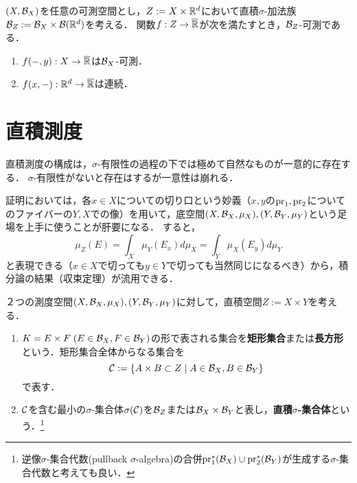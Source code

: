 \documentclass[uplatex, dvipdfmx]{jsreport}
\begin{document}
\begin{theorem}[直積の普遍性の破れ]
    $(X,\mathcal{B}_X)$を任意の可測空間とし，$Z:=X\times\mathbb{R}^d$において直積$\sigma$-加法族$\mathcal{B}_Z:=\mathcal{B}_X\times\mathcal{B}(\mathbb{R}^d)$を考える．
    関数$f:Z\to\overline{\mathbb{R}}$が次を満たすとき，$\mathcal{B}_Z$-可測である．
    \begin{enumerate}
        \item $f(-,y):X\to\overline{\mathbb{R}}$は$\mathcal{B}_X$-可測．
        \item $f(x,-):\mathbb{R}^d\to\overline{\mathbb{R}}$は連続．
    \end{enumerate}
\end{theorem}

\section{直積測度}

\begin{tcolorbox}[colframe=ForestGreen, colback=ForestGreen!10!white,breakable,colbacktitle=ForestGreen!40!white,coltitle=black,fonttitle=\bfseries\sffamily,
title=直積測度を積分形で捉える]
    直積測度の構成は，$\sigma$-有限性の過程の下では極めて自然なものが一意的に存在する．
    $\sigma$-有限性がないと存在はするが一意性は崩れる．

    証明においては，各$x\in X$についての切り口という妙義（$x,y$の$\mathrm{pr}_1,\mathrm{pr}_2$についてのファイバーの$Y,X$での像）を用いて，底空間$(X,\mathcal{B}_X,\mu_X),(Y,\mathcal{B}_Y,\mu_Y)$という足場を上手に使うことが肝要になる．
    すると，
    \[\mu_Z(E)=\int_X\mu_Y(E_x)d\mu_X=\int_Y\mu_X(E_y)d\mu_Y\]
    と表現できる（$x\in X$で切っても$y\in Y$で切っても当然同じになるべき）から，積分論の結果（収束定理）が流用できる．
\end{tcolorbox}

\begin{definition}
    ２つの測度空間$(X,\mathcal{B}_X,\mu_X),(Y,\mathcal{B}_Y,\mu_Y)$に対して，直積空間$Z:=X\times Y$を考える．
    \begin{enumerate}
        \item $K=E\times F\;(E\in\mathcal{B}_X,F\in\mathcal{B}_Y)$の形で表される集合を\textbf{矩形集合}または\textbf{長方形}という．矩形集合全体からなる集合を\[\mathcal{C}:=\left\{A\times B\subset Z\mid A\in\mathcal{B}_X,B\in\mathcal{B}_Y\right\}\]で表す．
        \item $\mathcal{C}$を含む最小の$\sigma$-集合体$\sigma(\mathcal{C})$を$\mathcal{B}_Z$または$\mathcal{B}_X\times\mathcal{B}_Y$と表し，\textbf{直積$\sigma$-集合体}という．\footnote{逆像$\sigma$-集合代数(pullback $\sigma$-algebra)の合併$\mathrm{pr}_1^*(\mathcal{B}_X)\cup\mathrm{pr}_2^*(\mathcal{B}_Y)$が生成する$\sigma$-集合代数と考えても良い．}
    \end{enumerate}
\end{definition}
\end{document}
